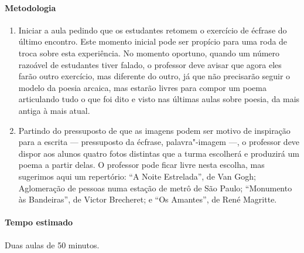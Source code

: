 \documentclass[12pt]{extarticle}
\begin{document}

\paragraph{Metodologia}

\begin{enumerate}

\item
Iniciar a aula pedindo que os estudantes retomem  o exercício de écfrase do
último encontro. Este momento inicial pode ser propício para uma roda de troca
sobre esta experiência. No momento oportuno, quando um número razoável de 
estudantes tiver falado, o professor deve avisar que agora eles farão
outro exercício, mas diferente do outro, já que não precisarão seguir 
o modelo da poesia arcaica, mas estarão livres para compor um poema
articulando tudo o que foi dito e visto nas últimas aulas sobre poesia,
da mais antiga à mais atual.

\item
Partindo do pressuposto de que as imagens podem ser motivo de inspiração
para a escrita --- pressuposto da écfrase, palavra"-imagem ---, o professor
deve dispor aos alunos quatro fotos distintas que a turma escolherá e 
produzirá um poema a partir delas. O professor pode ficar livre nesta escolha,
mas sugerimos aqui um repertório: ``A Noite Estrelada'', de Van Gogh; Aglomeração
de pessoas numa estação de metrô de São Paulo; ``Monumento às Bandeiras'', 
de Victor Brecheret; e ``Os Amantes'', de René Magritte.

\end{enumerate}





\paragraph{Tempo estimado} Duas aulas de 50 minutos.
\end{document}
